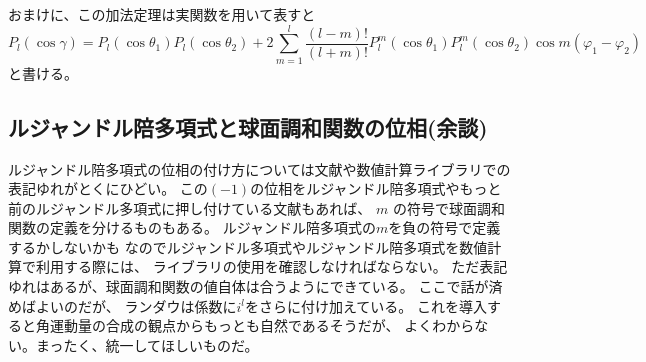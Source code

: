 \documentclass[../../master.tex]{subfiles}
\begin{document}
おまけに、この加法定理は実関数を用いて表すと
\begin{equation}
	P_l(\cos\gamma) = P_l(\cos\theta_1)P_l(\cos\theta_2)
	+ 2\sum_{m=1}^{l}\frac{(l-m)!}{(l+m)!}P_l^m(\cos\theta_1)P_l^m(\cos\theta_2)\cos m(\varphi_1-\varphi_2)
\end{equation}
と書ける。

\subsection{ルジャンドル陪多項式と球面調和関数の位相(余談)}

ルジャンドル陪多項式の位相の付け方については文献や数値計算ライブラリでの表記ゆれがとくにひどい。
この\((-1)\)の位相をルジャンドル陪多項式やもっと前のルジャンドル多項式に押し付けている文献もあれば、
\(m\) の符号で球面調和関数の定義を分けるものもある。
ルジャンドル陪多項式の\(m\)を負の符号で定義するかしないかも
なのでルジャンドル多項式やルジャンドル陪多項式を数値計算で利用する際には、
ライブラリの使用を確認しなければならない。
ただ表記ゆれはあるが、球面調和関数の値自体は合うようにできている。
ここで話が済めばよいのだが、
ランダウは係数に\(i^l\)をさらに付け加えている。
これを導入すると角運動量の合成の観点からもっとも自然であるそうだが、
よくわからない。まったく、統一してほしいものだ。


\end{document}
